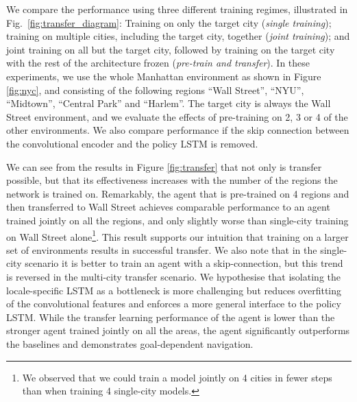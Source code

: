 We compare the performance using three different training regimes, illustrated in Fig.~\ref{fig:transfer_diagram}: Training on only the target city (\emph{single training}); training on multiple cities, including the target city, together (\emph{joint training}); and joint training on all but the target city, followed by training on the target city with the rest of the architecture frozen (\emph{pre-train and transfer}).
In these experiments, we use the whole Manhattan environment as shown in Figure \ref{fig:nyc}, and consisting of the following regions ``Wall Street'', ``NYU'', ``Midtown'', ``Central Park'' and ``Harlem''. The target city is always the Wall Street environment, and we evaluate the effects of pre-training on 2, 3 or 4 of the other environments. We also compare performance if the skip connection between the convolutional encoder and the policy LSTM is removed.

 We can see from the results in Figure \ref{fig:transfer} that not only is transfer possible, but that its effectiveness increases with the number of the regions the network is trained on. Remarkably, the agent that is pre-trained on 4 regions and then transferred to Wall Street achieves comparable performance to an agent trained jointly on all the regions, and only slightly worse than single-city training on Wall Street alone\footnote{We observed that we could train a model jointly on 4 cities in fewer steps than when training 4 single-city models.}. This result supports our intuition that training on a larger set of environments results in successful transfer. We also note that in the single-city scenario it is better to train an agent with a skip-connection, but this trend is reversed in the multi-city transfer scenario. We hypothesise that isolating the locale-specific LSTM as a bottleneck is more challenging but reduces overfitting of the convolutional features and enforces a more general interface to the policy LSTM. While the transfer learning performance of the agent is lower than the stronger agent trained jointly on all the areas, the agent significantly outperforms the baselines and demonstrates goal-dependent navigation. 

